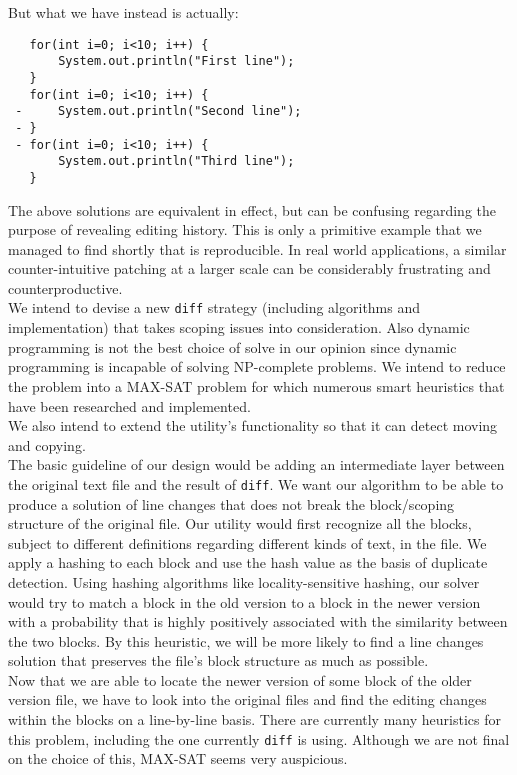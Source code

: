 \documentclass{article}
\begin{document}
\pagebreak
But what we have instead is actually:
\begin{lstlisting}
   for(int i=0; i<10; i++) {
       System.out.println("First line");
   }
   for(int i=0; i<10; i++) {
 -     System.out.println("Second line");
 - }
 - for(int i=0; i<10; i++) {
       System.out.println("Third line");
   }
\end{lstlisting}

The above solutions are equivalent in effect, but can be confusing regarding the purpose of revealing editing history. This is only a primitive example that we managed to find shortly that is reproducible. In real world applications, a similar counter-intuitive patching at a larger scale can be considerably frustrating and counterproductive.\\

We intend to devise a new \texttt{diff} strategy (including algorithms and implementation) that takes scoping issues into consideration. Also dynamic programming is not the best choice of solve in our opinion since dynamic programming is incapable of solving NP-complete problems. We intend to reduce the problem into a MAX-SAT problem for which numerous smart heuristics that have been researched and implemented.\\

We also intend to extend the utility's functionality so that it can detect moving and copying.\\

The basic guideline of our design would be adding an intermediate layer between the original text file and the result of \texttt{diff}. We want our algorithm to be able to produce a solution of line changes that does not break the block/scoping structure of the original file. Our utility would first recognize all the blocks, subject to different definitions regarding different kinds of text, in the file. We apply a hashing to each block and use the hash value as the basis of duplicate detection. Using hashing algorithms like locality-sensitive hashing, our solver would try to match a block in the old version to a block in the newer version with a probability that is highly positively associated with the similarity between the two blocks. By this heuristic, we will be more likely to find a line changes solution that preserves the file's block structure as much as possible.\\

Now that we are able to locate the newer version of some block of the older version file, we have to look into the original files and find the editing changes within the blocks on a line-by-line basis. There are currently many heuristics for this problem, including the one currently \texttt{diff} is using. Although we are not final on the choice of this, MAX-SAT seems very auspicious.
\end{document}
